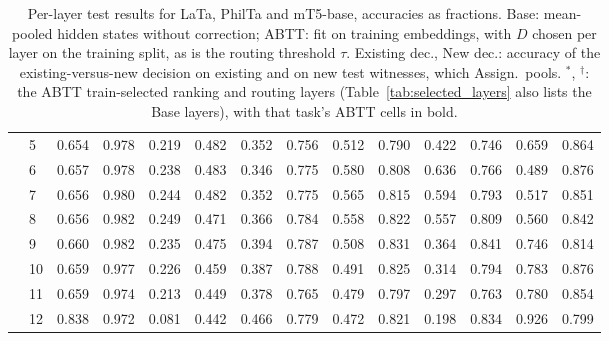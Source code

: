 \begin{table}[t]
\begin{tabular}{llcccccccccccc}
 & 5 & 0.654 & 0.978 & 0.219 & 0.482 & 0.352 & 0.756 & 0.512 & 0.790 & 0.422 & 0.746 & 0.659 & 0.864 \\
 & 6 & 0.657 & 0.978 & 0.238 & 0.483 & 0.346 & 0.775 & 0.580 & 0.808 & 0.636 & 0.766 & 0.489 & 0.876 \\
 & 7 & 0.656 & 0.980 & 0.244 & 0.482 & 0.352 & 0.775 & 0.565 & 0.815 & 0.594 & 0.793 & 0.517 & 0.851 \\
 & 8 & 0.656 & 0.982 & 0.249 & 0.471 & 0.366 & 0.784 & 0.558 & 0.822 & 0.557 & 0.809 & 0.560 & 0.842 \\
 & 9 & 0.660 & 0.982 & 0.235 & 0.475 & 0.394 & 0.787 & 0.508 & 0.831 & 0.364 & 0.841 & 0.746 & 0.814 \\
 & 10 & 0.659 & 0.977 & 0.226 & 0.459 & 0.387 & 0.788 & 0.491 & 0.825 & 0.314 & 0.794 & 0.783 & 0.876 \\
 & 11 & 0.659 & 0.974 & 0.213 & 0.449 & 0.378 & 0.765 & 0.479 & 0.797 & 0.297 & 0.763 & 0.780 & 0.854 \\
 & 12 & 0.838 & 0.972 & 0.081 & 0.442 & 0.466 & 0.779 & 0.472 & 0.821 & 0.198 & 0.834 & 0.926 & 0.799 \\
\bottomrule
\end{tabular}
\caption{Per-layer test results for LaTa, PhilTa and mT5-base, accuracies as fractions. Base: mean-pooled hidden states without correction; ABTT: fit on training embeddings, with $D$ chosen per layer on the training split, as is the routing threshold $\tau$. Existing dec., New dec.: accuracy of the existing-versus-new decision on existing and on new test witnesses, which Assign.\ pools. $^{\ast}$, $^{\dagger}$: the ABTT train-selected ranking and routing layers (Table~\ref{tab:selected_layers} also lists the Base layers), with that task's ABTT cells in bold.}
\label{tab:per_layer_t5}
\end{table}
